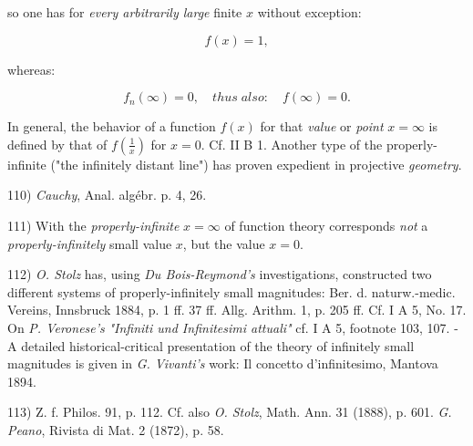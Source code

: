 \vspace{0.1cm}
\leftline{\rule{2in}{0.4pt}}
\vspace{0.1cm}
{
\footnotesize
so one has for \textit{every arbitrarily large} finite $x$ without exception:

\vspace{-0.3cm}
$$f(x) = 1,$$
\vspace{-0.5cm}

whereas: 

\vspace{-0.4cm}
$$f_n(\infty) = 0, \quad thus \; also: \quad f(\infty) = 0.$$
\vspace{-0.3cm}

In general, the behavior of a function $f(x)$ for that \textit{value} or \textit{point} $x = \infty$ is defined by that of $f(\frac{1}{x})$ for $x = 0$. Cf. II B 1. Another type of the properly-infinite ("the infinitely distant line") has proven expedient in projective \textit{geometry}.

110) \textit{Cauchy}, Anal. algébr. p. 4, 26.

111) With the \textit{properly-infinite} $x = \infty$ of function theory corresponds \textit{not} a \textit{properly-infinitely} small value $x$, but the value $x = 0$.

112) \textit{O. Stolz} has, using \textit{Du Bois-Reymond's} investigations, constructed two different systems of properly-infinitely small magnitudes: Ber. d. naturw.-medic. Vereins, Innsbruck 1884, p. 1 ff. 37 ff. Allg. Arithm. 1, p. 205 ff. Cf. I A 5, No. 17. On \textit{P. Veronese's} \textit{"Infiniti und Infinitesimi attuali"} cf. I A 5, footnote 103, 107. - A detailed historical-critical presentation of the theory of infinitely small magnitudes is given in \textit{G. Vivanti's} work: Il concetto d'infinitesimo, Mantova 1894.

113) Z. f. Philos. 91, p. 112. Cf. also \textit{O. Stolz}, Math. Ann. 31 (1888), p. 601. \textit{G. Peano}, Rivista di Mat. 2 (1872), p. 58.

}